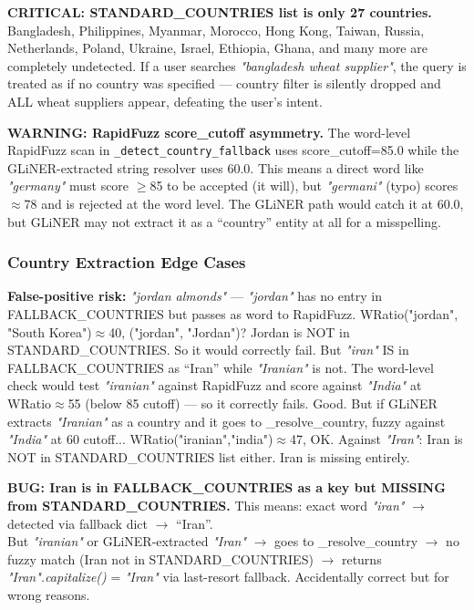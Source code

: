 \documentclass[12pt,a4paper]{article}
\begin{document}
\begin{issueBox}
\textbf{CRITICAL: STANDARD\_COUNTRIES list is only 27 countries.}
Bangladesh, Philippines, Myanmar, Morocco, Hong Kong, Taiwan, Russia, Netherlands,
Poland, Ukraine, Israel, Ethiopia, Ghana, and many more are completely undetected.
If a user searches \textit{"bangladesh wheat supplier"}, the query is treated as if
no country was specified --- country filter is silently dropped and ALL wheat suppliers
appear, defeating the user's intent.
\end{issueBox}

\begin{warnBox}
\textbf{WARNING: RapidFuzz score\_cutoff asymmetry.}
The word-level RapidFuzz scan in \texttt{\_detect\_country\_fallback} uses score\_cutoff=85.0
while the GLiNER-extracted string resolver uses 60.0. This means a direct word like
\textit{"germany"} must score $\geq$85 to be accepted (it will), but
\textit{"germani"} (typo) scores $\approx$78 and is rejected at the word level.
The GLiNER path would catch it at 60.0, but GLiNER may not extract it as a ``country''
entity at all for a misspelling.
\end{warnBox}

\subsubsection{Country Extraction Edge Cases}

\begin{warnBox}
\textbf{False-positive risk:} \textit{"jordan almonds"} --- \textit{"jordan"} has no entry in
FALLBACK\_COUNTRIES but passes as word to RapidFuzz. WRatio("jordan", "South Korea")$\approx$40,
("jordan", "Jordan")? Jordan is NOT in STANDARD\_COUNTRIES. So it would correctly fail.
But \textit{"iran"} IS in FALLBACK\_COUNTRIES as ``Iran'' while \textit{"Iranian"} is not.
The word-level check would test \textit{"iranian"} against RapidFuzz and score against
\textit{"India"} at WRatio$\approx$55 (below 85 cutoff) --- so it correctly fails. Good.
But if GLiNER extracts \textit{"Iranian"} as a country and it goes to \_resolve\_country,
fuzzy against \textit{"India"} at 60 cutoff... WRatio("iranian","india")$\approx$47, OK.
Against \textit{"Iran"}: Iran is NOT in STANDARD\_COUNTRIES list either. Iran is missing entirely.
\end{warnBox}

\begin{issueBox}
\textbf{BUG: Iran is in FALLBACK\_COUNTRIES as a key but MISSING from STANDARD\_COUNTRIES.}
This means: exact word \textit{"iran"} $\rightarrow$ detected via fallback dict $\rightarrow$ ``Iran''. \\
But \textit{"iranian"} or GLiNER-extracted \textit{"Iran"} $\rightarrow$ goes to \_resolve\_country $\rightarrow$
no fuzzy match (Iran not in STANDARD\_COUNTRIES) $\rightarrow$ returns \textit{"Iran".capitalize()}
= \textit{"Iran"} via last-resort fallback. Accidentally correct but for wrong reasons.
\end{issueBox}
\end{document}
